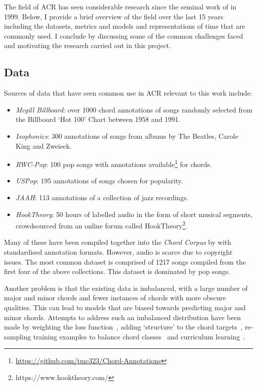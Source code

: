 The field of ACR has seen considerable research since the seminal work of \citet{FujishimaACR} in 1999. Below, I provide a brief overview of the field over the last 15 years including the datasets, metrics and models and representations of time that are commonly used. I conclude by discussing some of the common challenges faced and motivating the research carried out in this project. 

\subsection{Data}\label{sec:background-data}

Sources of data that have seen common use in ACR relevant to this work include:

\begin{itemize}
    \item \emph{Mcgill Billboard}: over 1000 chord annotations of songs randomly selected from the Billboard `Hot 100' Chart between 1958 and 1991.~\citep{McgillBillboard}
    \item \emph{Isophonics}: 300 annotations of songs from albums by The Beatles, Carole King and Zweieck.~\citep{Isophonics}
    \item \emph{RWC-Pop}: 100 pop songs with annotations available\footnote{\url{https://github.com/tmc323/Chord-Annotations}} for chords.~\citep{RWC}
    \item \emph{USPop}: 195 annotations of songs chosen for popularity.~\citep{USPop}
    \item \emph{JAAH}: 113 annotations of a collection of jazz recordings.~\citep{JAAH}
    \item \emph{HookTheory}: 50 hours of labelled audio in the form of short musical segments, crowdsourced from an online forum called HookTheory\footnote{https://www.hooktheory.com/}.~\citep{MelodyTranscriptionViaGenerativePreTraining}
\end{itemize}

Many of these have been compiled together into the \emph{Chord Corpus} by \citet{Choco} with standardised annotation formats. However, audio is scarce due to copyright issues. The most common dataset is comprised of 1217 songs compiled from the first four of the above collections. This dataset is dominated by pop songs.

Another problem is that the existing data is imbalanced, with a large number of major and minor chords and fewer instances of chords with more obscure qualities. This can lead to models that are biased towards predicting major and minor chords. Attempts to address such an imbalanced distribution have been made by weighting the loss function~\citep{ACRLargeVocab1}, adding `structure' to the chord targets~\citep{StructuredTraining,ACRLargeVocab1}, re-sampling training examples to balance chord classes~\citep{BalanceRandomForestACR} and curriculum learning~\citep{CurriculumLearning}.

